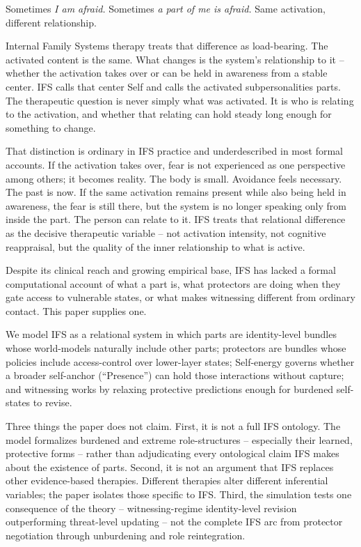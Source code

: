 \documentclass[11pt,a4paper]{article}
\begin{document}
Sometimes \emph{I am afraid.} Sometimes \emph{a part of me is afraid.}
Same activation, different relationship.

Internal Family Systems therapy treats that difference as load-bearing.
The activated content is the same. What changes is the system's
relationship to it -- whether the activation takes over or can be held
in awareness from a stable center. IFS calls that center Self and calls
the activated subpersonalities parts. The therapeutic question is never
simply what was activated. It is who is relating to the activation, and
whether that relating can hold steady long enough for something to
change.

That distinction is ordinary in IFS practice and underdescribed in most
formal accounts. If the activation takes over, fear is not experienced
as one perspective among others; it becomes reality. The body is small.
Avoidance feels necessary. The past is now. If the same activation
remains present while also being held in awareness, the fear is still
there, but the system is no longer speaking only from inside the part.
The person can relate to it. IFS treats that relational difference as
the decisive therapeutic variable -- not activation intensity, not
cognitive reappraisal, but the quality of the inner relationship to what
is active.

Despite its clinical reach and growing empirical base, IFS has lacked a
formal computational account of what a part is, what protectors are
doing when they gate access to vulnerable states, or what makes
witnessing different from ordinary contact. This paper supplies one.

We model IFS as a relational system in which parts are identity-level
bundles whose world-models naturally include other parts; protectors are
bundles whose policies include access-control over lower-layer states;
Self-energy governs whether a broader self-anchor (``Presence'') can
hold those interactions without capture; and witnessing works by
relaxing protective predictions enough for burdened self-states to
revise.

Three things the paper does not claim. First, it is not a full IFS
ontology. The model formalizes burdened and extreme role-structures --
especially their learned, protective forms -- rather than adjudicating
every ontological claim IFS makes about the existence of parts. Second,
it is not an argument that IFS replaces other evidence-based therapies.
Different therapies alter different inferential variables; the paper
isolates those specific to IFS. Third, the simulation tests one
consequence of the theory -- witnessing-regime identity-level revision
outperforming threat-level updating -- not the complete IFS arc from
protector negotiation through unburdening and role reintegration.
\end{document}
